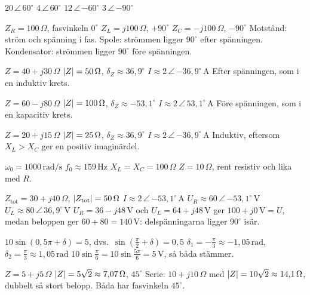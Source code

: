 \begin{facit}
  $20\,\angle\,60^{\circ}$  $4\,\angle\,60^{\circ}$
 $12\,\angle\,{-60^{\circ}}$  $3\,\angle\,{-90^{\circ}}$

  $Z_R = 100\,\Omega$, fasvinkeln $0^{\circ}$
 $Z_L = j100\,\Omega$, $+90^{\circ}$  $Z_C = -j100\,\Omega$, $-90^{\circ}$
 Motstånd: ström och spänning i fas. Spole: strömmen ligger $90^{\circ}$ efter spänningen.
Kondensator: strömmen ligger $90^{\circ}$ före spänningen.

  $Z = 40 + j30\,\Omega$  $\lvert Z\rvert = 50\,\Omega$, $\delta_Z \approx
36{,}9^{\circ}$  $I \approx 2\,\angle\,{-36{,}9^{\circ}}\,\text{A}$
 Efter spänningen, som i en induktiv krets.

  $Z = 60 - j80\,\Omega$  $\lvert Z\rvert = 100\,\Omega$, $\delta_Z \approx
-53{,}1^{\circ}$  $I \approx 2\,\angle\,53{,}1^{\circ}\,\text{A}$
 Före spänningen, som i en kapacitiv krets.

  $Z = 20 + j15\,\Omega$  $\lvert Z\rvert = 25\,\Omega$, $\delta_Z \approx
36{,}9^{\circ}$  $I \approx 2\,\angle\,{-36{,}9^{\circ}}\,\text{A}$
 Induktiv, eftersom $X_L > X_C$ ger en positiv imaginärdel.

  $\omega_0 = 1000\,\text{rad/s}$  $f_0 \approx 159\,\text{Hz}$
 $X_L = X_C = 100\,\Omega$
 $Z = 10\,\Omega$, rent resistiv och lika med $R$.

  $Z_{\text{tot}} = 30 + j40\,\Omega$, $\lvert Z_{\text{tot}}\rvert = 50\,\Omega$
 $I \approx 2\,\angle\,{-53{,}1^{\circ}}\,\text{A}$
 $U_R \approx 60\,\angle\,{-53{,}1^{\circ}}\,\text{V}$
 $U_L \approx 80\,\angle\,36{,}9^{\circ}\,\text{V}$
 $U_R = 36 - j48\,\text{V}$ och $U_L = 64 + j48\,\text{V}$ ger $100 + j0\,\text{V} = U$,
medan beloppen ger $60 + 80 = 140\,\text{V}$: delspänningarna ligger $90^{\circ}$ isär.

  $10\sin(0{,}5\pi + \delta) = 5$, dvs.\ $\sin\left(\frac{\pi}{2} + \delta\right)
= 0{,}5$
 $\delta_1 = -\frac{\pi}{3} \approx -1{,}05\,\text{rad}$, $\delta_2 = \frac{\pi}{3} \approx
1{,}05\,\text{rad}$
 $10\sin\frac{\pi}{6} = 10\sin\frac{5\pi}{6} = 5\,\text{V}$, så båda stämmer.

  $Z = 5 + j5\,\Omega$
 $\lvert Z\rvert = 5\sqrt{2} \approx 7{,}07\,\Omega$, $45^{\circ}$
 Serie: $10 + j10\,\Omega$ med $\lvert Z\rvert = 10\sqrt{2} \approx 14{,}1\,\Omega$, dubbelt så
stort belopp.
 Båda har fasvinkeln $45^{\circ}$.


\end{facit}
